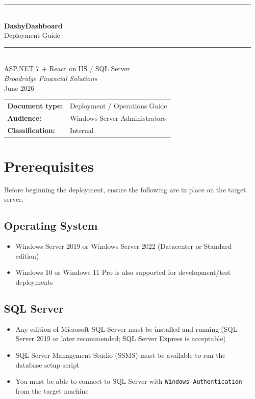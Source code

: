 \documentclass[12pt,a4paper]{report}
\begin{document}
\begin{titlepage}
  \centering
  \vspace*{3cm}
  {\color{broadblue}\rule{\linewidth}{1.5pt}}\\[0.6cm]
  {\Huge\bfseries\color{broadblue} DashyDashboard}\\[0.4cm]
  {\LARGE Deployment Guide}\\[0.3cm]
  {\color{broadblue}\rule{\linewidth}{1.5pt}}\\[1cm]
  {\large ASP.NET 7 + React on IIS / SQL Server}\\[2cm]
  {\large\itshape Broadridge Financial Solutions}\\[0.5cm]
  {\large June 2026}\\[3cm]
  \vfill
  {\small
    \begin{tabular}{ll}
      \textbf{Document type:}   & Deployment / Operations Guide \\
      \textbf{Audience:}        & Windows Server Administrators \\
      \textbf{Classification:}  & Internal \\
    \end{tabular}
  }
\end{titlepage}

\tableofcontents
\clearpage

\chapter{Prerequisites}

Before beginning the deployment, ensure the following are in place on the target server.

\section{Operating System}
\begin{itemize}
  \item Windows Server 2019 or Windows Server 2022 (Datacenter or Standard edition)
  \item Windows 10 or Windows 11 Pro is also supported for development/test deployments
\end{itemize}

\section{SQL Server}
\begin{itemize}
  \item Any edition of Microsoft SQL Server must be installed and running (SQL Server 2019 or later recommended; SQL Server Express is acceptable)
  \item SQL Server Management Studio (SSMS) must be available to run the database setup script
  \item You must be able to connect to SQL Server with \texttt{Windows Authentication} from the target machine
\end{itemize}
\end{document}

